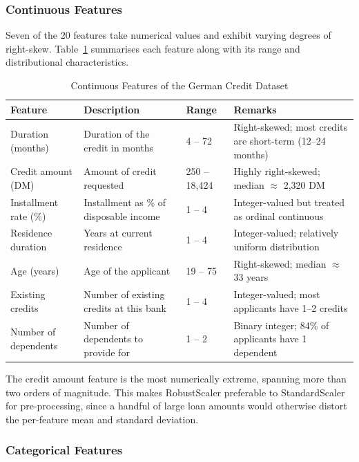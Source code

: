 \documentclass[12pt,a4paper]{article}
\begin{document}
\subsubsection{Continuous Features}

Seven of the 20 features take numerical values and exhibit varying degrees of right-skew. Table~\ref{tab:cont_features} summarises each feature along with its range and distributional characteristics.

\begin{table}[H]
\centering
\caption{Continuous Features of the German Credit Dataset}
\label{tab:cont_features}
\begin{tabular}{p{3.5cm}p{3.5cm}p{2.5cm}p{3.5cm}}
\toprule
\textbf{Feature} & \textbf{Description} & \textbf{Range} & \textbf{Remarks} \\
\midrule
Duration (months) & Duration of the credit in months & 4 -- 72 & Right-skewed; most credits are short-term (12--24 months) \\
Credit amount (DM) & Amount of credit requested & 250 -- 18,424 & Highly right-skewed; median $\approx$ 2,320 DM \\
Installment rate (\%) & Installment as \% of disposable income & 1 -- 4 & Integer-valued but treated as ordinal continuous \\
Residence duration & Years at current residence & 1 -- 4 & Integer-valued; relatively uniform distribution \\
Age (years) & Age of the applicant & 19 -- 75 & Right-skewed; median $\approx$ 33 years \\
Existing credits & Number of existing credits at this bank & 1 -- 4 & Integer-valued; most applicants have 1--2 credits \\
Number of dependents & Number of dependents to provide for & 1 -- 2 & Binary integer; 84\% of applicants have 1 dependent \\
\bottomrule
\end{tabular}
\end{table}

The credit amount feature is the most numerically extreme, spanning more than two orders of magnitude. This makes RobustScaler preferable to StandardScaler for pre-processing, since a handful of large loan amounts would otherwise distort the per-feature mean and standard deviation.

\subsubsection{Categorical Features}
\end{document}
